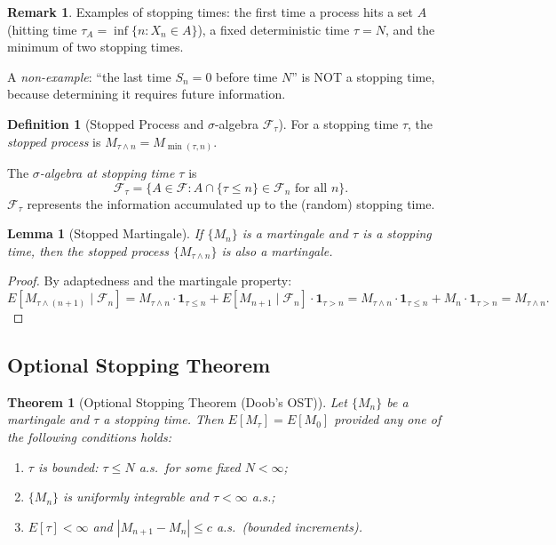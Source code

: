 \documentclass[12pt, a4paper]{article}
\theoremstyle{definition}
\newtheorem{definition}{Definition}[section]
\newtheorem{remark}{Remark}[section]
\theoremstyle{plain}
\newtheorem{theorem}{Theorem}[section]
\newtheorem{lemma}{Lemma}[section]
\begin{document}
\begin{remark}
Examples of stopping times: the first time a process hits a set $A$ (hitting time $\tau_A = \inf\{n : X_n \in A\}$), a fixed deterministic time $\tau = N$, and the minimum of two stopping times.

A \emph{non-example}: ``the last time $S_n = 0$ before time $N$'' is NOT a stopping time, because determining it requires future information.
\end{remark}

\begin{definition}[Stopped Process and $\sigma$-algebra $\mathcal{F}_\tau$]
For a stopping time $\tau$, the \emph{stopped process} is $M_{\tau \wedge n} = M_{\min(\tau, n)}$.

The \emph{$\sigma$-algebra at stopping time $\tau$} is
\[
  \mathcal{F}_\tau = \{A \in \mathcal{F} : A \cap \{\tau \leq n\} \in \mathcal{F}_n \text{ for all } n\}.
\]
$\mathcal{F}_\tau$ represents the information accumulated up to the (random) stopping time.
\end{definition}

\begin{lemma}[Stopped Martingale]
If $\{M_n\}$ is a martingale and $\tau$ is a stopping time, then the stopped process $\{M_{\tau \wedge n}\}$ is also a martingale.
\end{lemma}

\begin{proof}
By adaptedness and the martingale property:
\[
  E[M_{\tau \wedge (n+1)} \mid \mathcal{F}_n]
  = M_{\tau \wedge n} \cdot \mathbf{1}_{\tau \leq n} + E[M_{n+1} \mid \mathcal{F}_n] \cdot \mathbf{1}_{\tau > n}
  = M_{\tau \wedge n} \cdot \mathbf{1}_{\tau \leq n} + M_n \cdot \mathbf{1}_{\tau > n}
  = M_{\tau \wedge n}.
\]
\end{proof}

\subsection{Optional Stopping Theorem}

\begin{theorem}[Optional Stopping Theorem (Doob's OST)]
Let $\{M_n\}$ be a martingale and $\tau$ a stopping time. Then $E[M_\tau] = E[M_0]$ provided any one of the following conditions holds:
\begin{enumerate}[label=(\roman*)]
  \item $\tau$ is bounded: $\tau \leq N$ a.s.\ for some fixed $N < \infty$;
  \item $\{M_n\}$ is uniformly integrable and $\tau < \infty$ a.s.;
  \item $E[\tau] < \infty$ and $|M_{n+1} - M_n| \leq c$ a.s.\ (bounded increments).
\end{enumerate}
\end{theorem}
\end{document}
